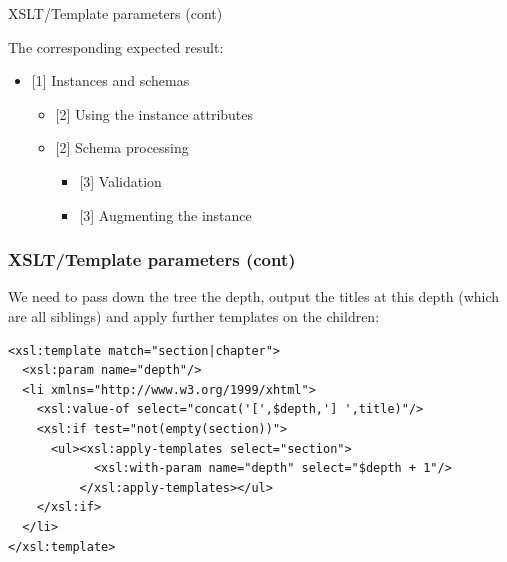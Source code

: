 %
\begin{frame}{XSLT/Template parameters (cont)}

The corresponding expected result:
\begin{itemize}

  \item {[1]} Instances and schemas
    \begin{itemize}

      \item {[2]} Using the instance attributes

      \item {[2]} Schema processing
        \begin{itemize}

          \item {[3]} Validation

          \item {[3]} Augmenting the instance

        \end{itemize}

    \end{itemize}

\end{itemize}

\end{frame}


%
\begin{frame}[containsverbatim]
\frametitle{XSLT/Template parameters (cont)}

We need to pass down the tree the depth, output the titles at this
depth (which are all siblings) and apply further templates on the
children:
{\small
\begin{verbatim}
<xsl:template match="section|chapter">
  <xsl:param name="depth"/>
  <li xmlns="http://www.w3.org/1999/xhtml">
    <xsl:value-of select="concat('[',$depth,'] ',title)"/>
    <xsl:if test="not(empty(section))">
      <ul><xsl:apply-templates select="section">
            <xsl:with-param name="depth" select="$depth + 1"/>
          </xsl:apply-templates></ul>
    </xsl:if>
  </li>
</xsl:template>
\end{verbatim}
}

\end{frame}


